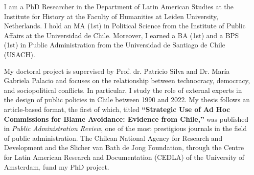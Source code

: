 




\par{I am a PhD Researcher in the Department of Latin American Studies at the Institute for History at the Faculty of Humanities at Leiden University, Netherlands. I hold an MA (1st) in Political Science from the Institute of Public Affairs at the Universidad de Chile. Moreover, I earned a BA (1st) and a BPS (1st) in Public Administration from the Universidad de Santiago de Chile (USACH).

My doctoral project is supervised by Prof. dr. Patricio Silva and Dr. María Gabriela Palacio and focuses on the relationship between technocracy, democracy, and sociopolitical conflicts. In particular, I study the role of external experts in the design of public policies in Chile between 1990 and 2022. My thesis follows an article-based format, the first of which, titled {\bfseries “Strategic Use of Ad Hoc Commissions for Blame Avoidance: Evidence from Chile,”} was published in {\itshape Public Administration Review}, one of the most prestigious journals in the field of public administration. The Chilean National Agency for Research and Development and the Slicher van Bath de Jong Foundation, through the Centre for Latin American Research and Documentation (CEDLA) of the University of Amsterdam, fund my PhD project.}\\